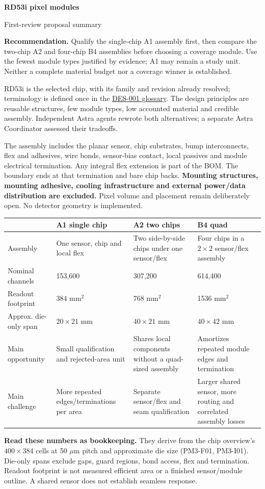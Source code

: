 \documentclass[10pt,a4paper]{article}
\newcommand{\repo}[2]{\href{https://github.com/asalzburger/nodd/blob/design/rd53-pixel-modules/#1}{#2}}
\newcommand{\heading}[1]{\vspace{3pt}{\large\bfseries #1}\par}
\begin{document}
{\LARGE\bfseries RD53i pixel modules}\par
{\large First-review proposal summary}\par
\textbf{Recommendation.} Qualify the single-chip A1 assembly first, then compare
the two-chip A2 and four-chip B4 assemblies before choosing a coverage module.
Use the fewest module types justified by evidence; A1 may remain a study unit.
Neither a complete material budget nor a coverage winner is established.

\heading{What is fixed, and what this review covers}
RD53i is the selected chip, with its family and revision already resolved;
terminology is defined once in the
\repo{docs/design/DES-001-rd53-pixel-modules.md\#glossary}{DES-001 glossary}.
The design principles are reusable structures, few module types, low accounted
material and credible assembly. Independent Astra agents rewrote both
alternatives; a separate Astra Coordinator assessed their tradeoffs.

The assembly includes the planar sensor, chip substrates, bump interconnects,
flex and adhesives, wire bonds, sensor-bias contact, local passives and
module electrical termination. Any integral flex extension is part of the BOM.
The boundary ends at that termination and bare chip backs.
\textbf{Mounting structures, mounting adhesive, cooling infrastructure and
external power/data distribution are excluded.} Pixel volume and placement
remain deliberately open. No detector geometry is implemented.

\heading{The alternatives at a glance}
\begin{tabularx}{\linewidth}{@{}lYYY@{}}
\toprule
 & \textbf{A1 single chip} & \textbf{A2 two chips} & \textbf{B4 quad}\\
\midrule
Assembly & One sensor, chip and local flex & Two side-by-side chips under one sensor/flex & Four chips in a $2\times2$ sensor/flex assembly\\
Nominal channels & 153,600 & 307,200 & 614,400\\
Readout footprint & 384 mm$^2$ & 768 mm$^2$ & 1536 mm$^2$\\
Approx. die-only span & $20\times21$ mm & $40\times21$ mm & $40\times42$ mm\\
Main opportunity & Small qualification and rejected-area unit & Shares local components without a quad-sized assembly & Amortizes repeated module edges and termination\\
Main challenge & More repeated edges/terminations per area & Separate sensor/flex and seam qualification & Larger shared sensor, more routing and correlated assembly losses\\
\bottomrule
\end{tabularx}
\textbf{Read these numbers as bookkeeping.} They derive from the chip overview's
$400\times384$ cells at 50 $\mu$m pitch and approximate die size (PM3-F01,
PM3-I01). Die-only spans exclude gaps, guard regions, bond access, flex and
termination. Readout footprint is not measured efficient area or a finished
sensor/module outline. A shared sensor does not establish seamless response.
\end{document}
